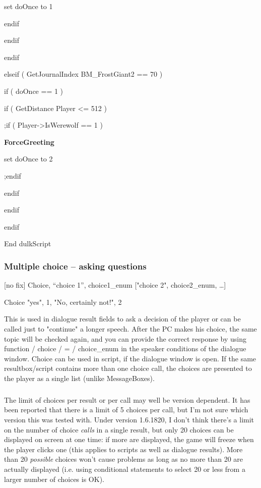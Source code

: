 \documentclass[
]{article}
\begin{document}
set doOnce to 1

endif

endif

endif

elseif ( GetJournalIndex BM\_FrostGiant2 == 70 )

if ( doOnce == 1 )

if ( GetDistance Player \textless= 512 )

;if ( Player-\textgreater IsWerewolf == 1 )

\textbf{ForceGreeting}

set doOnce to 2

;endif

endif

endif

endif

End dulkScript

\hypertarget{multiple-choice-asking-questions}{%
\subsubsection{Multiple choice -- asking
questions}\label{multiple-choice-asking-questions}}

{[}no fix{]} Choice, ``choice 1'', choice1\_enum {[}"choice 2",
choice2\_enum, \ldots{]}

Choice "yes", 1, "No, certainly not!", 2

This is used in dialogue result fields to ask a decision of the player
or can be called just to "continue" a longer speech. After the PC makes
his choice, the same topic will be checked again, and you can provide
the correct response by using function / choice / = / choice\_enum in
the speaker conditions of the dialogue window. Choice can be used in
script, if the dialogue window is open. If the same resultbox/script
contains more than one choice call, the choices are presented to the
player as a single list (unlike MessageBoxes).

\hypertarget{section-11}{%
\subparagraph{}\label{section-11}}

The limit of choices per result or per call may well be version
dependent. It has been reported that there is a limit of 5 choices per
call, but I'm not sure which version this was tested with. Under version
1.6.1820, I don't think there's a limit on the number of choice
\emph{calls} in a single result, but only 20 choices can be displayed on
screen at one time: if more are displayed, the game will freeze when the
player clicks one (this applies to scripts as well as dialogue results).
More than 20 \emph{possible} choices won't cause problems as long as no
more than 20 are actually displayed (i.e. using conditional statements
to select 20 or less from a larger number of choices is OK).
\end{document}
